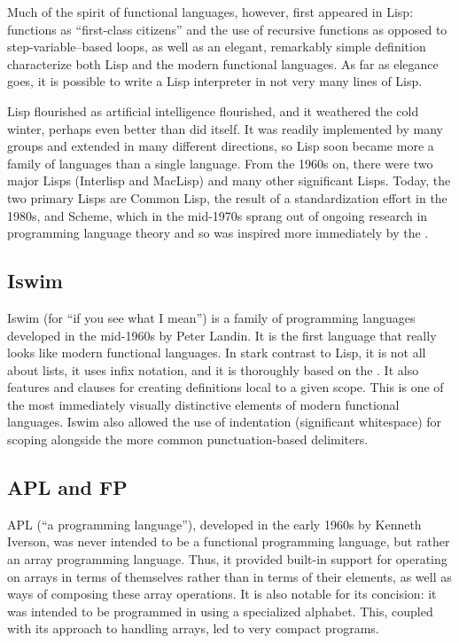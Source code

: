 Much of the spirit of functional languages, however, first appeared in Lisp: functions as ``first-class citizens'' and the use of recursive functions as opposed to step-variable--based loops, as well as an elegant, remarkably simple definition characterize both Lisp and the modern functional languages. As far as elegance goes, it is possible to write a Lisp interpreter in not very many lines of Lisp.

Lisp flourished as artificial intelligence flourished, and it weathered the cold  winter, perhaps even better than  did itself. It was readily implemented by many groups and extended in many different directions, so Lisp soon became more a family of languages than a single language. From the 1960s on, there were two major Lisps (Interlisp and MacLisp) and many other significant Lisps. Today, the two primary Lisps are Common Lisp, the result of a standardization effort in the 1980s, and Scheme, which in the mid-1970s sprang out of ongoing research in programming language theory and so was inspired more immediately by the \lambdacalc{}.

\subsection{Iswim}
Iswim (for ``if you see what I mean'') is a family of programming languages developed in the mid-1960s by Peter Landin. It is the first language that really looks like modern functional languages. In stark contrast to Lisp, it is not all about lists, it uses infix notation, and it is thoroughly based on the \lambdacalc{}. It also features  and  clauses for creating definitions local to a given scope. This is one of the most immediately visually distinctive elements of modern functional languages. Iswim also allowed the use of indentation (significant whitespace) for scoping alongside the more common punctuation-based delimiters.

\subsection{APL and FP}
APL (``a programming language''), developed in the early 1960s by Kenneth Iverson, was never intended to be a functional programming language, but rather an array programming language. Thus, it provided built-in support for operating on arrays in terms of themselves rather than in terms of their elements, as well as ways of composing these array operations. It is also notable for its concision: it was intended to be programmed in using a specialized alphabet. This, coupled with its approach to handling arrays, led to very compact programs.

